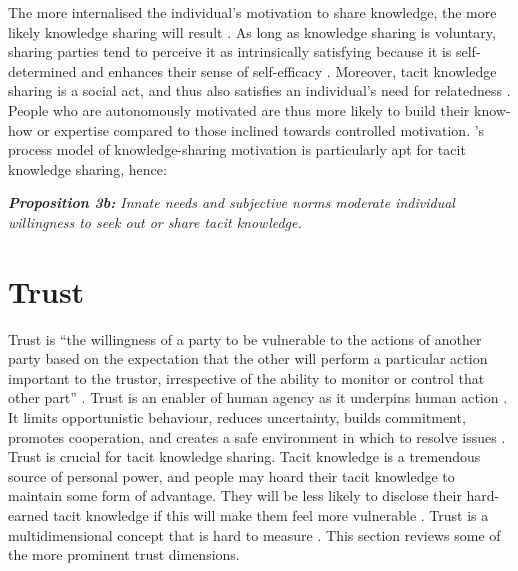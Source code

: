 The more internalised the individual's motivation to share knowledge, the more likely knowledge sharing will result \citep{gagne2009model,witherspoon2013antecedents}. As long as knowledge sharing is voluntary, sharing parties tend to perceive it as intrinsically satisfying because it is self-determined and enhances their sense of self-efficacy \citep{lam2010knowledge,dumbach2014establishing,nguyen2020review}. Moreover, tacit knowledge sharing is a social act, and thus also satisfies an individual's need for relatedness \citep{llopis2016understanding}. People who are autonomously motivated are thus more likely to build their know-how or expertise compared to those inclined towards controlled motivation. \citeauthor{gagne2009model}'s \citeyearpar{gagne2009model} process model of knowledge-sharing motivation is particularly apt for tacit knowledge sharing, hence: \bigskip

\begin{tcolorbox}
\textit{\textbf{Proposition 3b:} Innate needs and subjective norms moderate individual willingness to seek out or share tacit knowledge.}
\end{tcolorbox}

\section{Trust}

Trust is \enquote{the willingness of a party to be vulnerable to the actions of another party based on the expectation that the other will perform a particular action important to the trustor, irrespective of the ability to monitor or control that other part} \citep[][pg.~712]{mayer1995integrative}. Trust is an enabler of human agency as it underpins human action \citep{muller2008living,mcevily2011measuring}. It limits opportunistic behaviour, reduces uncertainty, builds commitment, promotes cooperation, and creates a safe environment in which to resolve issues \citep{nonaka1994dynamic,panteli2005trust,rasmussen2007work}. Trust is crucial for tacit knowledge sharing. Tacit knowledge is a tremendous source of personal power, and people may hoard their tacit knowledge to maintain some form of advantage. They will be less likely to disclose their hard-earned tacit knowledge if this will make them feel more vulnerable  \citep{levin2004strength,kankanhalli2005contributing,riege2005three,lin2007share,milne2007motivation,alsharo2017virtual}. Trust is a multidimensional concept that is hard to measure \citep{castelfranchi2008trust}. This section reviews some of the more prominent trust dimensions. 

